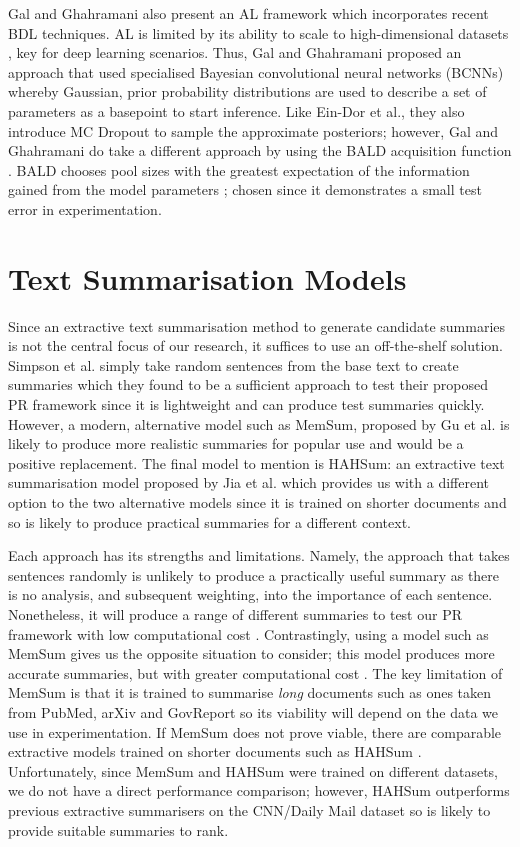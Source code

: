 \documentclass[ %
                    author={James Stephenson},
                supervisor={Dr. Edwin Simpson},
                    degree={MSc},
                     title={PROJECT PLAN},
                  subtitle={Bayesian Deep Learning For Extractive Test Summarisation},
                      type={},
                      year={2022}]{../additions/dissertation}
\begin{document}
		\medbreak
		Gal and Ghahramani \cite{Gal17} also present an AL framework which incorporates recent BDL techniques. AL is limited by its ability to scale to high-dimensional datasets \cite{Tong01}, key for deep learning scenarios. Thus, Gal and Ghahramani proposed an approach that used specialised Bayesian convolutional neural networks (BCNNs) whereby Gaussian, prior probability distributions are used to describe a set of parameters as a basepoint to start inference. Like Ein-Dor et al., they also introduce MC Dropout to sample the approximate posteriors; however, Gal and Ghahramani do take a different approach by using the BALD acquisition function \cite{Houlsby11}. BALD chooses pool sizes with the greatest expectation of the information gained from the model parameters \cite{Gal17}; chosen since it demonstrates a small test error in experimentation.

		\section{Text Summarisation Models}
		\label{chap:literaturereview:summodels}
		
		Since an extractive text summarisation method to generate candidate summaries is not the central focus of our research, it suffices to use an off-the-shelf solution. Simpson et al. \cite{Simpson19} simply take random sentences from the base text to create summaries which they found to be a sufficient approach to test their proposed PR framework since it is lightweight and can produce test summaries quickly. However, a modern, alternative model such as MemSum, proposed by Gu et al. \cite{Gu22} is likely to produce more realistic summaries for popular use and would be a positive replacement. The final model to mention is HAHSum: an extractive text summarisation model proposed by Jia et al. \cite{Jia20} which provides us with a different option to the two alternative models since it is trained on shorter documents and so is likely to produce practical summaries for a different context.
		
		\medbreak
		Each approach has its strengths and limitations. Namely, the approach that takes sentences randomly is unlikely to produce a practically useful summary as there is no analysis, and subsequent weighting, into the importance of each sentence. Nonetheless, it will produce a range of different summaries to test our PR framework with low computational cost \cite{Simpson19}. Contrastingly, using a model such as MemSum gives us the opposite situation to consider; this model produces more accurate summaries, but with greater computational cost \cite{Gu22}. The key limitation of MemSum is that it is trained to summarise \emph{long} documents such as ones taken from PubMed, arXiv and GovReport so its viability will depend on the data we use in experimentation. If MemSum does not prove viable, there are comparable extractive models trained on shorter documents such as HAHSum \cite{Jia20}. Unfortunately, since MemSum and HAHSum were trained on different datasets, we do not have a direct performance comparison; however, HAHSum outperforms previous extractive summarisers on the CNN/Daily Mail dataset \cite{Nallapati16, Jia20} so is likely to provide suitable summaries to rank.
		
\end{document}
